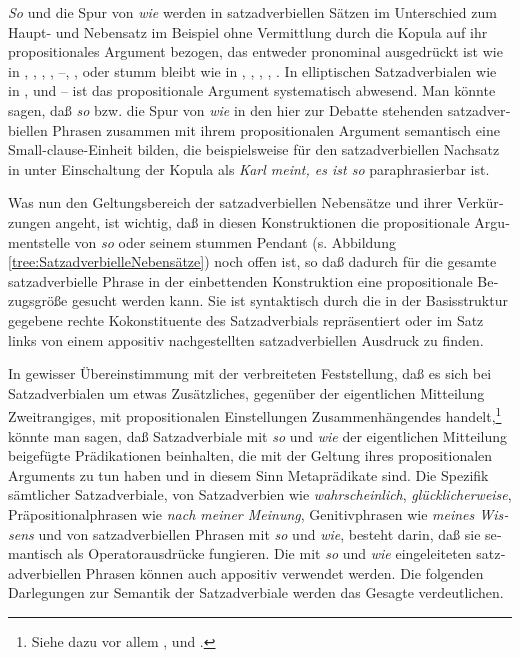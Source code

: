 \documentclass[output=paper, colorlinks, citecolor=brown, booklanguage=german]{langscibook}
\begin{document}
\begin{otherlanguage}{german}
\textit{So} und die Spur von \textit{wie} werden in satzadverbiellen Sätzen im Unterschied zum Haupt- und Nebensatz im Beispiel  ohne Vermittlung durch die Kopula auf ihr propositionales Argument bezogen, das entweder pronominal ausgedrückt ist wie in , , , , --, ,  oder stumm bleibt wie in , , , , . In elliptischen Satzadverbialen wie in ,  und -- ist das propositionale Argument systematisch abwesend. Man könnte sagen, daß \textit{so} bzw. die Spur von \textit{wie} in den hier zur Debatte stehenden satzadverbiellen Phrasen zusammen mit ihrem propositionalen Argument semantisch eine Small-clause-Einheit bilden, die beispielsweise für den satzadverbiellen Nachsatz in  unter Einschaltung der Kopula als \textit{Karl meint, es ist so} paraphrasierbar ist.

Was nun den Geltungsbereich der satzadverbiellen Nebensätze und ihrer Verkürzungen angeht, ist wichtig, daß in diesen Konstruktionen die propositionale Argumentstelle von \textit{so} oder seinem stummen Pendant (s. Abbildung \ref{tree:SatzadverbielleNebensätze}) noch offen ist, so daß dadurch für die gesamte satzadverbielle Phrase in der einbettenden Konstruktion eine propositionale Bezugsgröße gesucht werden kann. Sie ist syntaktisch durch die in der Basisstruktur gegebene rechte Kokonstituente des Satzadverbials repräsentiert oder im Satz links von einem appositiv nachgestellten satzadverbiellen Ausdruck zu finden.

In gewisser Übereinstimmung mit der verbreiteten Feststellung, daß es sich bei Satzadverbialen um etwas Zusätzliches, gegenüber der eigentlichen Mitteilung Zweitrangiges, mit propositionalen Einstellungen Zusammenhängendes handelt,\footnote{Siehe dazu vor allem \citet{lang1979zum-status-der-satzadverbiale, lang1983einstellungsausdrucke}, \citet{lang1976recension} und \citet{helbig1990lexikon}.} könnte man sagen, daß Satzadverbiale mit \textit{so} und \textit{wie} der eigentlichen Mitteilung beigefügte Prädikationen beinhalten, die mit der Geltung ihres propositionalen Arguments zu tun haben und in diesem Sinn Metaprädikate sind. Die Spezifik sämtlicher Satzadverbiale, von Satzadverbien wie \textit{wahrscheinlich}, \textit{glücklicherweise}, Präpositionalphrasen wie \textit{nach meiner Meinung}, Genitivphrasen wie \textit{meines Wissens} und von satzadverbiellen Phrasen mit \textit{so} und \textit{wie}, besteht darin, daß sie semantisch als Operatorausdrücke fungieren. Die mit \textit{so} und \textit{wie} eingeleiteten satzadverbiellen Phrasen können auch appositiv verwendet werden. Die folgenden Darlegungen zur Semantik der Satzadverbiale werden das Gesagte verdeutlichen.


\end{otherlanguage}
\end{document}
